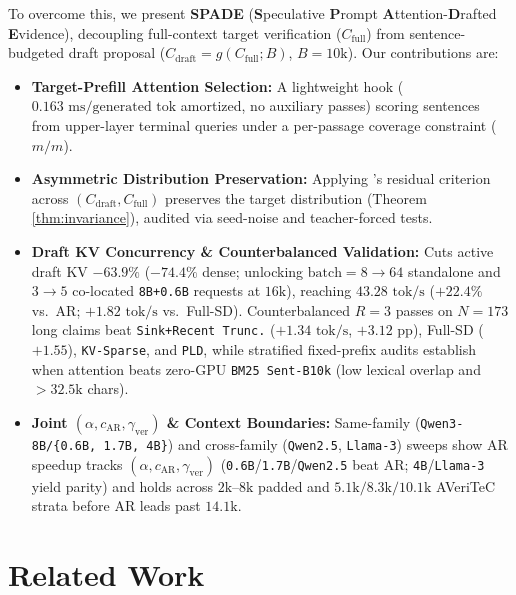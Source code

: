 \documentclass[11pt]{article}
\begin{document}
To overcome this, we present \textbf{SPADE} (\textbf{S}peculative \textbf{P}rompt \textbf{A}ttention-\textbf{D}rafted \textbf{E}vidence), decoupling full-context target verification ($C_{\text{full}}$) from sentence-budgeted draft proposal ($C_{\text{draft}} = g(C_{\text{full}}; B)$, $B=10\text{k}$). Our contributions are:
\begin{itemize}
    \item \textbf{Target-Prefill Attention Selection:} A lightweight hook ($0.163\text{ ms/generated tok}$ amortized, no auxiliary passes) scoring sentences from upper-layer terminal queries under a per-passage coverage constraint ($m/m$).
    \item \textbf{Asymmetric Distribution Preservation:} Applying \citet{leviathan2023fast}'s residual criterion across $(C_{\text{draft}}, C_{\text{full}})$ preserves the target distribution (Theorem \ref{thm:invariance}), audited via seed-noise and teacher-forced tests.
    \item \textbf{Draft KV Concurrency \& Counterbalanced Validation:} Cuts active draft KV \textbf{$-63.9\%$} ($-74.4\%$ dense; unlocking $\text{batch}=8 \to 64$ standalone and $3 \to 5$ co-located \texttt{8B+0.6B} requests at $16\text{k}$), reaching $43.28\text{ tok/s}$ ($+22.4\%$ vs.\ AR; $+1.82\text{ tok/s}$ vs.\ Full-SD). Counterbalanced $R=3$ passes on $N=173$ long claims beat \texttt{Sink+Recent Trunc.} ($+1.34\text{ tok/s}$, $+3.12\text{ pp}$), Full-SD ($+1.55$), \texttt{KV-Sparse}, and \texttt{PLD}, while stratified fixed-prefix audits establish when attention beats zero-GPU \texttt{BM25 Sent-B10k} (low lexical overlap and $>32.5\text{k}$ chars).
    \item \textbf{Joint $(\alpha, c_{\text{AR}}, \gamma_{\text{ver}})$ \& Context Boundaries:} Same-family (\texttt{Qwen3-8B/\{0.6B, 1.7B, 4B\}}) and cross-family (\texttt{Qwen2.5}, \texttt{Llama-3}) sweeps show AR speedup tracks $(\alpha, c_{\text{AR}}, \gamma_{\text{ver}})$ (\texttt{0.6B}/\texttt{1.7B}/\texttt{Qwen2.5} beat AR; \texttt{4B}/\texttt{Llama-3} yield parity) and holds across $2\text{k}$--$8\text{k}$ padded and $5.1\text{k}/8.3\text{k}/10.1\text{k}$ AVeriTeC strata before AR leads past $14.1\text{k}$.
\end{itemize}

\section{Related Work}
\label{sec:related}
\end{document}
